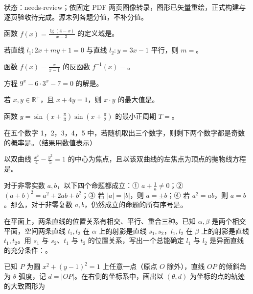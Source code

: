 

状态：needs-review；依固定 PDF 两页图像转录，图形已矢量重绘，正式构建与逐页验收待完成。源未列各题分值，不补分值。


\begin{question}
函数 $f(x)=\frac{\lg(4-x)}{x-3}$ 的定义域是\gkblank{}。
\end{question}
\begin{question}
若直线 $l_1:2x+my+1=0$ 与直线 $l_2:y=3x-1$ 平行，则 $m=$\gkblank{}。
\end{question}
\begin{question}
函数 $f(x)=\frac{x}{x-1}$ 的反函数 $f^{-1}(x)=$\gkblank{}。
\end{question}
\begin{question}
方程 $9^x-6\cdot3^x-7=0$ 的解是\gkblank{}。
\end{question}
\begin{question}
若 $x,y\in\mathbb R^+$，且 $x+4y=1$，则 $x\cdot y$ 的最大值是\gkblank{}。
\end{question}
\begin{question}
函数 $y=\sin(x+\frac\pi3)\sin(x+\frac\pi2)$ 的最小正周期 $T=$\gkblank{}。
\end{question}
\begin{question}
在五个数字 1，2，3，4，5 中，若随机取出三个数字，则剩下两个数字都是奇数的概率是\gkblank{}。（结果用数值表示）
\end{question}
\begin{question}
以双曲线 $\frac{x^2}{4}-\frac{y^2}{5}=1$ 的中心为焦点，且以该双曲线的左焦点为顶点的抛物线方程是\gkblank{}。
\end{question}
\begin{question}
对于非零实数 $a,b$，以下四个命题都成立：① $a+\frac1a\ne0$；② $(a+b)^2=a^2+2ab+b^2$；③ 若 $|a|=|b|$，则 $a=\pm b$；④ 若 $a^2=ab$，则 $a=b$。那么，对于非零复数 $a,b$，仍然成立的命题的所有序号是\gkblank{}。
\end{question}
\begin{question}
在平面上，两条直线的位置关系有相交、平行、重合三种。已知 $\alpha,\beta$ 是两个相交平面，空间两条直线 $l_1,l_2$ 在 $\alpha$ 上的射影是直线 $s_1,s_2$，$l_1,l_2$ 在 $\beta$ 上的射影是直线 $t_1,t_2$。用 $s_1$ 与 $s_2$、$t_1$ 与 $t_2$ 的位置关系，写出一个总能确定 $l_1$ 与 $l_2$ 是异面直线的充分条件：\gkblank{}。
\Needspace{0.4\textheight}
\end{question}
\begin{question}
已知 $P$ 为圆 $x^2+(y-1)^2=1$ 上任意一点（原点 $O$ 除外），直线 $OP$ 的倾斜角为 $\theta$ 弧度，记 $d=|OP|$。在右侧的坐标系中，画出以 $(\theta,d)$ 为坐标的点的轨迹的大致图形为 
\nopagebreak[4]
\begin{center}\end{center}
\nopagebreak[4]
\end{question}


